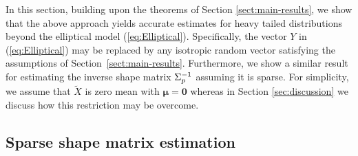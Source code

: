 \documentclass[times,sort&compress,3p]{elsarticle}
\begin{document}
In this section, building upon the theorems of Section \ref{sect:main-results}, we show that the above approach yields accurate estimates for
heavy tailed distributions 
beyond the elliptical model (\ref{eq:Elliptical}). 
Specifically, the vector $Y$ in (\ref{eq:Elliptical}) may be replaced by any isotropic random vector satisfying the assumptions of Section~\ref{sect:main-results}. Furthermore, we show a similar result for estimating the inverse shape matrix $\Sigma_p^{-1}$ assuming it is sparse.
For simplicity, we assume that $\tilde X$ is zero mean with
$\bm{\mu} = \bm{0}$ whereas in Section
\ref{sec:discussion} we discuss how this restriction may be overcome. 

\subsection{Sparse shape matrix estimation}
\label{sec:app-sparse-cov}
\end{document}
